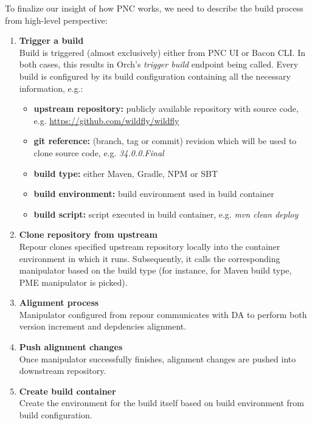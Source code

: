 \documentclass[../main.tex]{subfiles}
\begin{document}
To finalize our insight of how PNC works, we need to describe the build process from high-level perspective:
\begin{enumerate}
    \item \textbf{Trigger a build}\\
    Build is triggered (almost exclusively) either from PNC UI or Bacon CLI. In both cases, this results in Orch's \textit{trigger build} endpoint being called. Every build is configured by its build configuration containing all the necessary information, e.g.:
    \begin{itemize}
        \item \textbf{upstream repository:} publicly available repository with source code, e.g. \url{https://github.com/wildfly/wildfly}
        \item \textbf{git reference:} (branch, tag or commit) revision which will be used to clone source code, e.g. \textit{34.0.0.Final}
        \item \textbf{build type:} either Maven, Gradle, NPM or SBT
        \item \textbf{build environment:} build environment used in build container
        \item \textbf{build script:} script executed in build container, e.g. \textit{mvn clean deploy}
    \end{itemize}

    \item \textbf{Clone repository from upstream}\\
    Repour clones specified upstream repository locally into the container environment in which it runs. Subsequently, it calls the corresponding manipulator based on the build type (for instance, for Maven build type, PME manipulator is picked).

    \item \textbf{Alignment process}\\
    Manipulator configured from repour communicates with DA to perform both version increment and depdencies alignment.

    \item \textbf{Push alignment changes}\\
    Once manipulator successfully finishes, alignment changes are pushed into downstream repository.

    \item \textbf{Create build container}\\
    Create the environment for the build itself based on build environment from build configuration.


\end{enumerate}
\end{document}
